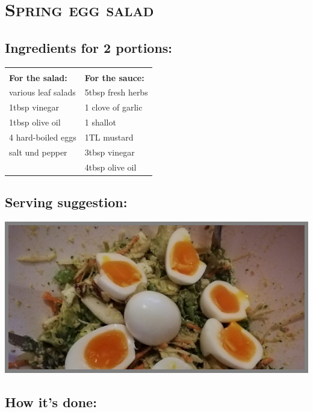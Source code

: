 \section{\textsc{Spring egg salad}}

\subsection*{Ingredients for 2 portions:}

\begin{tabular}{p{7.5cm} p{7.5cm}}
	& \\
	\textbf{For the salad:} & \textbf{For the sauce:} \\
	various leaf salads & 5tbsp fresh herbs \\
	1tbsp vinegar & 1 clove of garlic \\
	1tbsp olive oil & 1 shallot \\
	4 hard-boiled eggs & 1TL mustard \\
	salt und pepper & 3tbsp vinegar \\
	& 4tbsp olive oil
\end{tabular}

\subsection*{Serving suggestion:}

\includegraphics[width=\textwidth]{img/eiersalat.jpeg} \cite{fruehlingeiersalat}

\subsection*{How it's done:}

